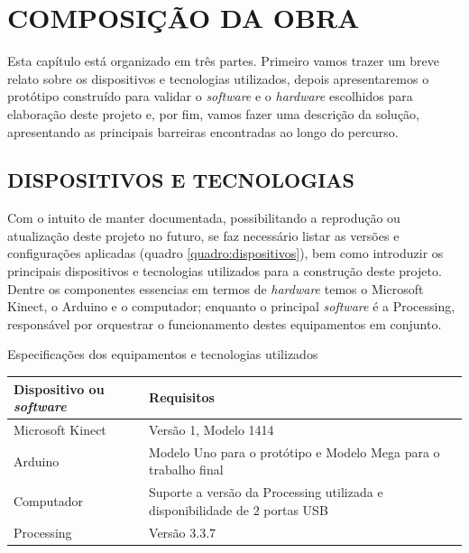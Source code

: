 \chapter{COMPOSIÇÃO DA OBRA}
Esta capítulo está organizado em três partes. Primeiro vamos trazer um breve relato sobre os dispositivos e tecnologias utilizados, depois apresentaremos o protótipo construído para validar o \textit{software} e o \textit{hardware} escolhidos para elaboração deste projeto e, por fim, vamos fazer uma descrição da solução, apresentando as principais barreiras encontradas ao longo do percurso. 

\section{DISPOSITIVOS E TECNOLOGIAS}

Com o intuito de manter documentada, possibilitando a reprodução ou atualização deste projeto no futuro, se faz necessário listar as versões e configurações aplicadas (quadro \ref{quadro:dispositivos}), bem como introduzir os principais dispositivos e tecnologias utilizados para a construção deste projeto. Dentre os componentes essencias em termos de \textit{hardware} temos o Microsoft Kinect, o Arduino e o computador; enquanto o principal \textit{software} é a Processing, responsável por orquestrar o funcionamento destes equipamentos em conjunto. 


\begin{quadro}[H]
\caption{\label{quadro:dispositivos}Especificações dos equipamentos e tecnologias utilizados}
\begin{center}  
  \begin{tabulary}{0.8\textwidth}{|L|L|}
  
  \hline
  \textbf{Dispositivo ou \textit{software}} & \textbf{Requisitos} \\ \hline
  Microsoft Kinect  & Versão 1, Modelo 1414 \\ \hline
  Arduino & Modelo Uno para o protótipo e Modelo Mega para o trabalho final \\ \hline
  Computador & Suporte a versão da Processing utilizada e disponibilidade de 2 portas USB \\ \hline
  Processing & Versão 3.3.7 \\ \hline
  \end{tabulary}
\end{center}
\vspace*{-0,7cm}
\\
\end{quadro}


